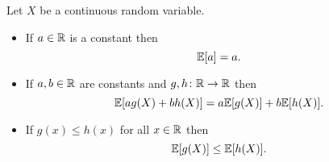 \documentclass[class=article, crop=false]{standalone}
\begin{document}
  \begin{theorem}{}
    Let $X$ be a continuous random variable.
    \begin{itemize}
      \item If $a\in\mathbb{R}$ is a constant then
      \[
        \mathbb{E}[a] = a.
      \]
      \item If $a, b\in\mathbb{R}$ are constants and $g, h\colon \mathbb{R}\to \mathbb{R}$ then
      \[
        \mathbb{E}[ag(X) + bh(X)] = a\mathbb{E}[g(X)] + b\mathbb{E}[h(X)].
      \]
      \item If $g(x) \leq h(x)$ for all $x\in\mathbb{R}$ then
      \[
        \mathbb{E}[g(X)] \leq \mathbb{E}[h(X)].
      \]
    \end{itemize}
  \end{theorem}
\end{document}
